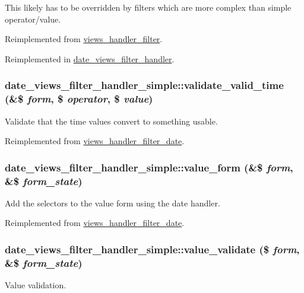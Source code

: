 This likely has to be overridden by filters which are more complex than simple operator/value. 

Reimplemented from \hyperlink{classviews__handler__filter_a4c1eb0bdb4f81b5a2b2de137e1ffe2cd}{views\_\-handler\_\-filter}.

Reimplemented in \hyperlink{classdate__views__filter__handler_adaa0b2cd0664c75f987af0b79386a3b7}{date\_\-views\_\-filter\_\-handler}.\hypertarget{classdate__views__filter__handler__simple_ac0a2fbc2f0984aab89796283d5b8c995}{
\subsubsection[{validate\_\-valid\_\-time}]{\setlength{\rightskip}{0pt plus 5cm}date\_\-views\_\-filter\_\-handler\_\-simple::validate\_\-valid\_\-time (\&\$ {\em form}, \/  \$ {\em operator}, \/  \$ {\em value})}}
\label{classdate__views__filter__handler__simple_ac0a2fbc2f0984aab89796283d5b8c995}
Validate that the time values convert to something usable. 

Reimplemented from \hyperlink{classviews__handler__filter__date_ad19ed65f3335ed1ac6896fe17a480b4e}{views\_\-handler\_\-filter\_\-date}.\hypertarget{classdate__views__filter__handler__simple_a59232ef0a63cc9cf0a4a702ea6b06f12}{
\subsubsection[{value\_\-form}]{\setlength{\rightskip}{0pt plus 5cm}date\_\-views\_\-filter\_\-handler\_\-simple::value\_\-form (\&\$ {\em form}, \/  \&\$ {\em form\_\-state})}}
\label{classdate__views__filter__handler__simple_a59232ef0a63cc9cf0a4a702ea6b06f12}
Add the selectors to the value form using the date handler. 

Reimplemented from \hyperlink{classviews__handler__filter__date_a5c7fb298feef092a2cb3bc3f75f54f29}{views\_\-handler\_\-filter\_\-date}.\hypertarget{classdate__views__filter__handler__simple_ae3ced9cf12ef2a13e687f28a64b218f5}{
\subsubsection[{value\_\-validate}]{\setlength{\rightskip}{0pt plus 5cm}date\_\-views\_\-filter\_\-handler\_\-simple::value\_\-validate (\$ {\em form}, \/  \&\$ {\em form\_\-state})}}
\label{classdate__views__filter__handler__simple_ae3ced9cf12ef2a13e687f28a64b218f5}
Value validation.

